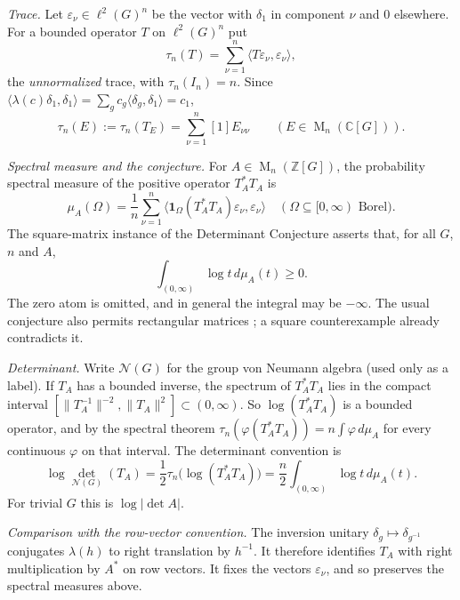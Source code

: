\documentclass[11pt]{article}
\theoremstyle{remark}
\numberwithin{equation}{section}
\newcommand{\Z}{\mathbb Z}
\newcommand{\C}{\mathbb C}
\newcommand{\Mat}{\operatorname{M}}
\newcommand{\N}{\mathcal N}
\begin{document}
\emph{Trace.} Let $\varepsilon_\nu\in\ell^2(G)^n$ be the vector with $\delta_1$ in component $\nu$ and $0$ elsewhere. For a bounded operator $T$ on $\ell^2(G)^n$ put
\[
 \tau_n(T)=\sum_{\nu=1}^n\langle T\varepsilon_\nu,\varepsilon_\nu\rangle ,
\]
the \emph{unnormalized} trace, with $\tau_n(I_n)=n$. Since $\langle\lambda(c)\delta_1,\delta_1\rangle=\sum_gc_g\langle\delta_g,\delta_1\rangle=c_1$,
\begin{equation}\label{eq:trace-coeff}
 \tau_n(E):=\tau_n(T_E)=\sum_{\nu=1}^n[1]E_{\nu\nu}\qquad(E\in\Mat_n(\C[G])).
\end{equation}

\emph{Spectral measure and the conjecture.} For $A\in\Mat_n(\Z[G])$, the probability spectral measure of the positive operator $T_A^*T_A$ is
\[
 \mu_A(\Omega)=\frac1n\sum_{\nu=1}^n
 \langle \mathbf1_\Omega(T_A^*T_A)\varepsilon_\nu,\varepsilon_\nu\rangle
 \quad(\Omega\subseteq[0,\infty)\text{ Borel}).
\]
The square-matrix instance of the Determinant Conjecture asserts that, for all $G$, $n$ and $A$,
\begin{equation}\label{eq:conjecture}
 \int_{(0,\infty)}\log t\,d\mu_A(t)\ge0.
\end{equation}
The zero atom is omitted, and in general the integral may be $-\infty$. The usual conjecture also permits rectangular matrices \cite[Conjecture 13.2]{Luck2002}; a square counterexample already contradicts it.

\emph{Determinant.} Write $\N(G)$ for the group von Neumann algebra (used only as a label). If $T_A$ has a bounded inverse, the spectrum of $T_A^*T_A$ lies in the compact interval $[\|T_A^{-1}\|^{-2},\|T_A\|^2]\subset(0,\infty)$. So $\log(T_A^*T_A)$ is a bounded operator, and by the spectral theorem $\tau_n(\varphi(T_A^*T_A))=n\int\varphi\,d\mu_A$ for every continuous $\varphi$ on that interval. The determinant convention is
\begin{equation}\label{eq:normalization}
 \log\det_{\N(G)}(T_A)
 =\frac12\tau_n\bigl(\log(T_A^*T_A)\bigr)
 =\frac n2\int_{(0,\infty)}\log t\,d\mu_A(t).
\end{equation}
For trivial $G$ this is $\log|\det A|$.

\emph{Comparison with the row-vector convention.} The inversion unitary $\delta_g\mapsto\delta_{g^{-1}}$ conjugates $\lambda(h)$ to right translation by $h^{-1}$. It therefore identifies $T_A$ with right multiplication by $A^*$ on row vectors. It fixes the vectors $\varepsilon_\nu$, and so preserves the spectral measures above.
\end{document}
